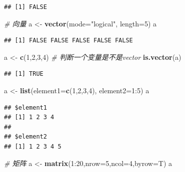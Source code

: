 \documentclass[]{article}
\newenvironment{Shaded}{\begin{snugshade}}{\end{snugshade}}
\newcommand{\KeywordTok}[1]{\textcolor[rgb]{0.13,0.29,0.53}{\textbf{{#1}}}}
\newcommand{\DataTypeTok}[1]{\textcolor[rgb]{0.13,0.29,0.53}{{#1}}}
\newcommand{\DecValTok}[1]{\textcolor[rgb]{0.00,0.00,0.81}{{#1}}}
\newcommand{\StringTok}[1]{\textcolor[rgb]{0.31,0.60,0.02}{{#1}}}
\newcommand{\CommentTok}[1]{\textcolor[rgb]{0.56,0.35,0.01}{\textit{{#1}}}}
\newcommand{\NormalTok}[1]{{#1}}
\numberwithin{figure}{section}
\numberwithin{table}{section}
\theoremstyle{definition}
\theoremstyle{definition}
\theoremstyle{definition}
\theoremstyle{remark}
\begin{document}
\begin{verbatim}
## [1] FALSE
\end{verbatim}

\begin{Shaded}
\begin{Highlighting}[]
\CommentTok{# 向量}
\NormalTok{a <-}\StringTok{ }\KeywordTok{vector}\NormalTok{(}\DataTypeTok{mode=}\StringTok{"logical"}\NormalTok{, }\DataTypeTok{length=}\DecValTok{5}\NormalTok{)}
\NormalTok{a}
\end{Highlighting}
\end{Shaded}

\begin{verbatim}
## [1] FALSE FALSE FALSE FALSE FALSE
\end{verbatim}

\begin{Shaded}
\begin{Highlighting}[]
\NormalTok{a <-}\StringTok{ }\KeywordTok{c}\NormalTok{(}\DecValTok{1}\NormalTok{,}\DecValTok{2}\NormalTok{,}\DecValTok{3}\NormalTok{,}\DecValTok{4}\NormalTok{)}
\CommentTok{# 判断一个变量是不是vector}
\KeywordTok{is.vector}\NormalTok{(a)}
\end{Highlighting}
\end{Shaded}

\begin{verbatim}
## [1] TRUE
\end{verbatim}

\begin{Shaded}
\begin{Highlighting}[]
\NormalTok{a <-}\StringTok{ }\KeywordTok{list}\NormalTok{(}\DataTypeTok{element1=}\KeywordTok{c}\NormalTok{(}\DecValTok{1}\NormalTok{,}\DecValTok{2}\NormalTok{,}\DecValTok{3}\NormalTok{,}\DecValTok{4}\NormalTok{), }\DataTypeTok{element2=}\DecValTok{1}\NormalTok{:}\DecValTok{5}\NormalTok{)}
\NormalTok{a}
\end{Highlighting}
\end{Shaded}

\begin{verbatim}
## $element1
## [1] 1 2 3 4
## 
## $element2
## [1] 1 2 3 4 5
\end{verbatim}

\begin{Shaded}
\begin{Highlighting}[]
\CommentTok{# 矩阵}
\NormalTok{a <-}\StringTok{ }\KeywordTok{matrix}\NormalTok{(}\DecValTok{1}\NormalTok{:}\DecValTok{20}\NormalTok{,}\DataTypeTok{nrow=}\DecValTok{5}\NormalTok{,}\DataTypeTok{ncol=}\DecValTok{4}\NormalTok{,}\DataTypeTok{byrow=}\NormalTok{T)}
\NormalTok{a}
\end{Highlighting}
\end{Shaded}
\end{document}
